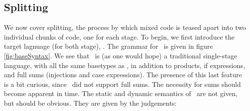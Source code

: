 \documentclass{article}
\begin{document}

%

\subsection{Splitting}

We now cover splitting, the process by which mixed code is teased apart into two individual chunks of code, one for each stage.  To begin, we first introduce the target lagnuage (for both stage), \coremono.   The grammar for \coremono~is given in figure \ref{fig:baseSyntax}.  We see that \coremono~is (as one would hope) a traditional single-stage language, with all the same basetypes as \corelang, in addition to products, if expressions, and full sums (injections and case expressions).  The presence of this last feature is a bit curious, since \corelang~did not support full sums.  The necessity for sums should become apparent in time.  The static and dynamic semantics of \coremono~are not given, but should be obvious.  They are given by the judgements:
\end{document}
